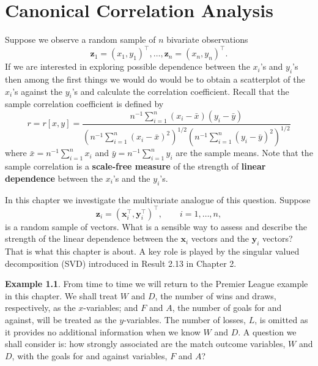 \documentclass[]{book}
\theoremstyle{definition}
\theoremstyle{definition}
\newtheorem{example}{Example}[chapter]
\theoremstyle{definition}
\theoremstyle{remark}
\begin{document}
\hypertarget{cca}{%
\chapter{Canonical Correlation Analysis}\label{cca}}

Suppose we observe a random sample of \(n\) bivariate observations
\[
\boldsymbol z_1=(x_1,y_1)^\top , \ldots , \boldsymbol z_n=(x_n,y_n)^\top.
\]
If we are interested in exploring possible dependence between the \(x_i\)'s and \(y_i\)'s then among the first things we would do would be to obtain a scatterplot of the \(x_i\)'s against the \(y_i\)'s and calculate the correlation coefficient. Recall that the sample correlation coefficient is defined by
\begin{equation}
r=r[x,y]=\frac{n^{-1}\sum_{i=1}^n (x_i-\bar{x})(y_i-\bar{y})}{\left ( n^{-1}\sum_{i=1}^n (x_i-\bar{x})^2  \right )^{1/2}  \left ( n^{-1}\sum_{i=1}^n (y_i-\bar{y})^2 \right )^{1/2}}
\label{eq:scr}
\end{equation}
where \(\bar{x}=n^{-1}\sum_{i=1}^n x_i\) and \(\bar{y}=n^{-1}\sum_{i=1}^n y_i\) are the sample means. Note that the sample correlation is a \textbf{scale-free measure} of the strength of \textbf{linear dependence} between the \(x_i\)'s and the \(y_i\)'s.

In this chapter we investigate the multivariate analogue of this question. Suppose
\[
\boldsymbol z_i =(\boldsymbol x_i^\top,\boldsymbol y_i^\top)^\top, \qquad i=1,\ldots, n,
\]
is a random sample of vectors. What is a sensible way to assess and describe the strength of the linear dependence between the \(\boldsymbol x_i\) vectors and the \(\boldsymbol y_i\) vectors? That is what this chapter is about. A key role is played by the singular valued decomposition (SVD) introduced in Result 2.13 in Chapter 2.

\begin{example}
\protect\hypertarget{exm:prem}{}{\label{exm:prem} }From time to time we will return to the Premier League example in this chapter. We shall treat \(W\) and \(D\), the number of wins and draws, respectively, as the \(x\)-variables; and \(F\) and \(A\), the number of goals for and against, will be treated as the \(y\)-variables. The number of losses, \(L\), is omitted as it provides no additional information when we know \(W\) and \(D\). A question we shall consider is: how strongly associated are the match outcome variables, \(W\) and \(D\), with the goals for and against variables, \(F\) and \(A\)?
\end{example}
\end{document}
